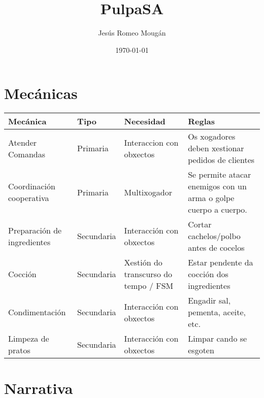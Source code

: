 \documentclass{report}  %
\title{PulpaSA}  %
\author{Jesús Romeo Mougán}                     %
\date{\today}                           %
\begin{document}
\captionsetup{aboveskip=5pt, belowskip=10pt}



\renewcommand{\contentsname}{Índice}

\tableofcontents


\newpage

\section{Mecánicas}

\begin{table}[h]
    \centering
    \renewcommand{\arraystretch}{1.3} %
    \setlength{\tabcolsep}{10pt} %
    \label{tab:mecanicas}
    \begin{tabular}{|p{2cm}|p{2cm}|p{3cm}|p{8cm}|}
        \hline
        \rowcolor{octopus} %
        \textbf{Mecánica}  & \textbf{Tipo} & \textbf{Necesidad} & \textbf{Reglas} \\
        \hline
        Atender Comandas & Primaria  & Interaccion con obxectos  & Os xogadores deben xestionar pedidos de clientes \\
        \hline
        Coordinación cooperativa & Primaria  & Multixogador    & Se permite atacar enemigos con un arma o golpe cuerpo a cuerpo. \\
        \hline
        Preparación de ingredientes  & Secundaria & Interacción con obxectos & Cortar cachelos/polbo antes de cocelos \\
        \hline
        Cocción & Secundaria & Xestión do transcurso do tempo / FSM & Estar pendente da cocción dos ingredientes \\
        \hline
        Condimentación & Secundaria & Interacción con obxectos & Engadir sal, pementa, aceite, etc. \\
        \hline
        Limpeza de pratos & Secundaria & Interacción con obxectos & Limpar cando se esgoten \\
        \hline

    \end{tabular}
\end{table}


\section{Narrativa}
\end{document}
